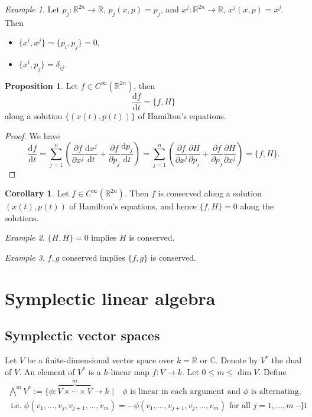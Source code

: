 \documentclass[11pt]{amsart}
\numberwithin{equation}{section}
\theoremstyle{plain}
\theoremstyle{definition}
\newtheorem{prop}{Proposition}[subsection]
\newtheorem{cor}{Corollary}[subsection]
\theoremstyle{remark}
\newtheorem{ex}{Example}[subsection]
\newcommand{\R}{\mathbb{R}}
\newcommand{\dd}{{\mathrm{d}}}
\begin{document}
\begin{ex}
Let $p_j\colon \R^{2n}\to \R$, $p_j(x,p)=p_j$, and $x^j\colon \R^{2n}\to \R$, $x^j(x,p)=x^j$. Then 
\begin{itemize}
\item{$\{x^{i},x^j\}=\{p_i,p_j\}=0$,
}
\item{$\{x^{i},p_j\}=\delta_{ij}$.}
\end{itemize}
\end{ex}

\begin{prop}
Let $f\in C^\infty(\R^{2n})$, then $$\frac{\dd f}{\dd t}=\{f,H\}$$ along a solution $\{(x(t),p(t))\}$ of Hamilton's equations.
\end{prop}

\begin{proof} We have
$$\frac{\dd f}{\dd t}=\sum_{j=1}^n\left(\frac{\partial f}{\partial x^j}\frac{\dd x^j}{\dd t}+\frac{\partial f}{\partial p_j}\frac{\dd p_j}{\dd t}\right)=\sum_{j=1}^n\left(\frac{\partial f}{\partial x^j}\frac{\partial H}{\partial p_j}+\frac{\partial f}{\partial p_j}\frac{\partial H}{\partial x^j}\right)=\{f,H\}.$$
\end{proof}


\begin{cor}
Let $f\in C^\infty(\R^{2n})$. Then $f$ is conserved along a solution $(x(t),p(t))$ of Hamilton's equations, and hence $\{f,H\}=0$ along the solutions.
\end{cor}

\begin{ex}
$\{H,H\}=0$ implies $H$ is conserved.
\end{ex}
\begin{ex}
$f,g$ conserved implies $\{f,g\}$ is conserved.
\end{ex}

\section{Symplectic linear algebra}

\subsection{Symplectic vector spaces} Let $V$ be a finite-dimensional vector space over $k=\R$ or $\mathbb{C}$. Denote by $V^*$ the dual of $V$. An element of $V^*$ is a $k$-linear map $f\colon V\to k$. Let $0\leq m\leq \dim V$. Define 
\begin{multline*}
\bigwedge^mV^*:=\Big\{\phi\colon \overbrace{V\times\dotsm \times V}^{m}\to k\,\,\big|\,\, \text{ $\phi$ is linear in each argument and $\phi$ is alternating,}\\
\text{ i.e. $\phi(v_1,...,v_j,v_{j+1},...,v_m)=-\phi(v_1,...,v_{j+1},v_j,...,v_m)$ for all $j=1,...,m-1$}\Big\}
\end{multline*}
\end{document}
